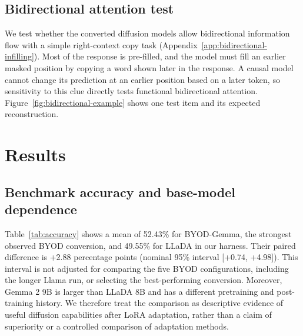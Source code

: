 \documentclass{article}
\begin{document}
\subsection{Bidirectional attention test}
We test whether the converted diffusion models allow bidirectional information flow with a simple right-context copy task (Appendix~\ref{app:bidirectional-infilling}). Most of the response is pre-filled, and the model must fill an earlier masked position by copying a word shown later in the response. A causal model cannot change its prediction at an earlier position based on a later token, so sensitivity to this clue directly tests functional bidirectional attention. Figure~\ref{fig:bidirectional-example} shows one test item and its expected reconstruction.

\section{Results}

\subsection{Benchmark accuracy and base-model dependence}

\begin{table}[t]
\caption{Accuracy (\%) in our common harness: 250 shared questions per task, or all 164 HumanEval questions. D is a converted diffusion model; AR is its unchanged parent. Llama D-25k and D-50k share the same parent. Bold marks the best observed common-harness diffusion score; underline marks the best observed BYOD score (ties retained). The average gives each task equal weight; its nominal, unadjusted 95\% bootstrap interval appears below it. Published LLaDA scores use a separate protocol and have no interval computed here. AR has intentionally longer output limits (Appendix~\ref{app:inference-settings}). Full per-task intervals appear in Appendix~\ref{app:benchmark-uncertainty}.}
\label{tab:accuracy}
\centering
\scriptsize
\setlength{\tabcolsep}{2pt}
\resizebox{\textwidth}{!}{%
}
\end{table}

Table~\ref{tab:accuracy} shows a mean of 52.43\% for BYOD-Gemma, the strongest observed BYOD conversion, and 49.55\% for LLaDA in our harness. Their paired difference is +2.88 percentage points (nominal 95\% interval [+0.74, +4.98]). This interval is not adjusted for comparing the five BYOD configurations, including the longer Llama run, or selecting the best-performing conversion. Moreover, Gemma 2 9B is larger than LLaDA 8B and has a different pretraining and post-training history. We therefore treat the comparison as descriptive evidence of useful diffusion capabilities after LoRA adaptation, rather than a claim of superiority or a controlled comparison of adaptation methods.
\end{document}

